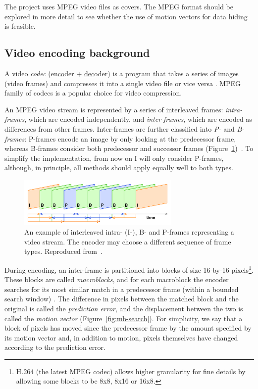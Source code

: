 \documentclass[12pt,british,twoside,notitlepage,usenames,dvipsnames,hypens,final]{report}
\numberwithin{equation}{section}
\numberwithin{figure}{section}
\begin{document}
The project uses MPEG video files as covers. The MPEG format should be explored in more detail to see whether the use of motion vectors for data hiding is feasible.

\subsection{Video encoding background}

A video \emph{codec} (en\underline{co}der + \underline{dec}oder) is a program that takes a series of images (video frames) and compresses it into a single video file or vice versa \cite[sec.~3.1]{richardson2004h}. MPEG family of codecs is a popular choice for video compression.

An MPEG video stream is represented by a series of interleaved frames: \emph{intra-frames}, which are encoded independently, and \emph{inter-frames}, which are encoded as differences from other frames. Inter-frames are further classified into \emph{P-} and \emph{B-frames}: P-frames encode an image by only looking at the predecessor frame, whereas B-frames consider both predecessor and successor frames (Figure~\ref{fig:ipb-seq})~\cite{crowcroft1999internetworking}. To simplify the implementation, from now on I will only consider P-frames, although, in principle, all methods should apply equally well to both types.

\begin{figure}[tbh]
\centerline{\includegraphics[width=0.7\textwidth, height=0.7\textheight, keepaspectratio]{img/IPB_images_sequence.png}}
\caption{An example of interleaved intra- (I-), B- and P-frames representing a video stream. The encoder may choose a different sequence of frame types. Reproduced from~\cite{interframe-wiki}.}
\label{fig:ipb-seq}
\end{figure}

During encoding, an inter-frame is partitioned into blocks of size 16-by-16 pixels\footnote{H.264 (the latest MPEG codec) allows higher granularity for fine details by allowing some blocks to be 8x8, 8x16 or 16x8.}. These blocks are called \emph{macroblocks}, and for each macroblock the encoder searches for its most similar match in a predecessor frame (within a bounded search window) \cite[p.~256]{richardson2004h}. The difference in pixels between the matched block and the original is called the \emph{prediction error}, and the displacement between the two is called the \emph{motion vector} (Figure~\ref{fig:mb-search}). For simplicity, we say that a block of pixels has moved since the predecessor frame by the amount specified by its motion vector and, in addition to motion, pixels themselves have changed according to the prediction error.
\end{document}

